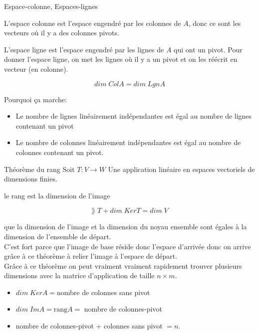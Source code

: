 \begin{parag}{Espace-colonne, Espaces-lignes}
    \begin{truc}
        L'espace colonne est l'espace engendré par les colonnes de $A$, donc ce sont les vecteurs où il y a des colonnes pivots.
    \end{truc}
    \begin{truc}
        L'espace ligne est l'espace engendré par les lignes de $A$ qui ont un pivot. Pour donner l'espace ligne, on met les lignes où il y a un pivot et on les réécrit en vecteur (en colonne).
    \end{truc}
    \begin{truc}
        \[dim\; ColA = dim\; LgnA\]
    \end{truc}
    Pourquoi ça marche:
    \begin{itemize}
        \item Le nombre de lignes linéairement indépendantes est égal au nombre de lignes contenant un pivot
        \item Le nombre de colonnes linéairement indépendantes est égal au nombre de colonnes contenant un pivot.
    \end{itemize}
\end{parag}

\begin{parag}{Théorème du rang}
Soit $T: V \to W$ Une application linéaire en espaces vectoriels de dimensions finies.
    \begin{truc} 
        le rang est la dimension de l'image
    \end{truc}
    \begin{truc}
        \begin{formule}
            \[\rang\; T + dim\; KerT = dim\; V\]
        \end{formule}
    \end{truc}
    que la dimension de l'image et la dimension du noyau ensemble sont égales à la dimension de l'ensemble de départ.\\
    C'est fort parce que l'image de base réside donc l'espace d'arrivée donc on arrive grâce à ce théorème à relier l'image à l'espace de départ. 
    \\
    Grâce à ce théorème on peut vraiment vraiment rapidement trouver plusieurs dimensions avec la matrice d'application de taille $n \times m$.
    \begin{itemize}
        \item $dim\; KerA = $nombre de colonnes sans pivot
        \item $dim\; ImA = \text{rang}A = $ nombre de colonnes-pivot
        \item nombre de colonnes-pivot + colonnes sans pivot $= n$.
    \end{itemize}
\end{parag}

